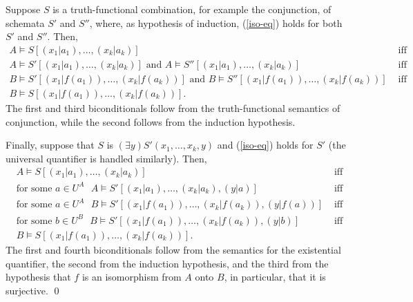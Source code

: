 Suppose $S$ is a truth-functional combination, for example the conjunction, of schemata $S'$ and $S''$, where, as hypothesis of induction, (\ref{iso-eq}) holds for both $S'$ and $S''$. Then,
\[
\begin{array}{lc}
A\models S[(x_1|a_1),\ldots,(x_k|a_k)] & \mbox{ iff}\\
A\models S'[(x_1|a_1),\ldots,(x_k|a_k)]\mbox{ and }A\models S''[(x_1|a_1),\ldots,(x_k|a_k)] & \mbox{ iff}\\
B\models S'[(x_1|f(a_1)),\ldots,(x_k|f(a_k))]\mbox{ and }B\models S''[(x_1|f(a_1)),\ldots,(x_k|f(a_k))] & \mbox{ iff}\\
B\models S[(x_1|f(a_1)),\ldots,(x_k|f(a_k))].
\end{array}
\]
The first and third biconditionals follow from the truth-functional semantics of conjunction, while the second follows from the induction hypothesis.

Finally, suppose that $S$ is $(\exists y)S'(x_1,\ldots,x_k,y)$ and (\ref{iso-eq}) holds for $S'$ (the universal quantifier is handled similarly). Then,
\[
\begin{array}{lc}
A\models S[(x_1|a_1),\ldots,(x_k|a_k)] & \mbox{ iff}\\
\mbox{for some $a\in U^A$ }
A\models S'[(x_1|a_1),\ldots,(x_k|a_k),(y|a)] & \mbox{ iff}\\
\mbox{for some $a\in U^A$ }
B\models S'[(x_1|f(a_1)),\ldots,(x_k|f(a_k)),(y|f(a))] & \mbox{ iff}\\
\mbox{for some $b\in U^B$ }
B\models S'[(x_1|f(a_1)),\ldots,(x_k|f(a_k)),(y|b)] & \mbox{ iff}\\
B\models S[(x_1|f(a_1)),\ldots,(x_k|f(a_k))].
\end{array}
\]
The first and fourth biconditionals follow from the semantics for the existential quantifier, the second from the induction hypothesis, and the third from the hypothesis that $f$ is an isomorphism from $A$ onto $B$, in particular, that it is
surjective. \qed 

\fi
